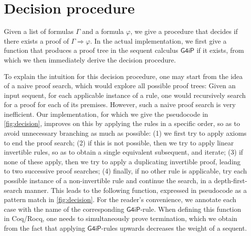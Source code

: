 \documentclass[english,review]{jflart}
\newcommand{\Coq}{{Coq/Rocq}}
\theoremstyle{definition}
\theoremstyle{plain}
\renewcommand{\phi}{\varphi}
\newcommand{\Gfourip}{\mathsf{G4iP}}
\begin{document}
\section{Decision procedure}\label{sec:decision}
Given a list of formulas $\Gamma$ and a formula $\phi$, we give a procedure that
decides if there exists a proof of $\Gamma \Rightarrow \phi$. 
In the actual implementation, we first give a function that 
produces a proof tree in the sequent calculus $\Gfourip$ if it exists, from which we then 
immediately derive the decision procedure.

To explain the intuition for this decision procedure, one may start from the idea of a naive proof search, which would explore all possible proof trees: Given an input sequent, for each applicable instance of a rule, one would recursively search for a proof for each of its premises.
However, such a naive proof search is very inefficient.
Our implementation, for which we give the pseudocode in \cref{fig:decision}, improves on this by applying the rules in a specific order, so as to avoid unnecessary branching as much as possible: (1) we first try to apply axioms to end the proof search; (2) if this is not possible, then we try to apply linear invertible rules, so as to obtain a single equivalent subsequent, and iterate; (3) if none of these apply, then we try to apply a duplicating invertible proof, leading to two successive proof searches; (4) finally, if no other rule is applicable, try each possible instance of a non-invertible rule and continue the search, in a depth-first-search manner. This leads to the following function, expressed in pseudocode as a pattern match in \cref{fig:decision}. For the reader's convenience, we annotate each case with the name of the corresponding $\Gfourip$-rule. When defining this function in {\Coq}, one needs to simultaneously prove termination, which we obtain from the fact that applying $\Gfourip$-rules upwards decreases the weight of a sequent. 
\end{document}
